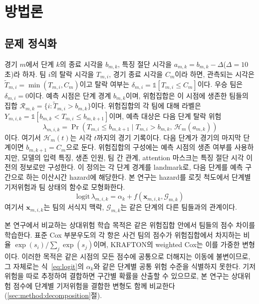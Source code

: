 \section{방법론}
\label{sec:method}

\subsection{문제 정식화}
\label{sec:method:formulation}

경기 $m$에서 단계 $k$의 종료 시각을 $b_{m,k}$, 특징 절단 시각을 $a_{m,k}=b_{m,k}-\Delta$($\Delta=10$초)라 하자.
팀 $i$의 탈락 시각을 $T_{m,i}$, 경기 종료 시각을 $C_m$이라 하면, 관측되는 시각은 $\widetilde T_{m,i}=\min(T_{m,i},C_m)$이고 탈락 여부는 $\delta_{m,i}=\mathbb{1}[T_{m,i}\le C_m]$이다. 우승 팀은 $\delta_{m,i}=0$이다.
예측 시점은 단계 경계 $b_{m,k}$이며, 위험집합은 이 시점에 생존한 팀들의 집합 $\mathcal{R}_{m,k}=\{i:\widetilde T_{m,i}>b_{m,k}\}$이다.
위험집합의 각 팀에 대해 라벨은 $Y_{m,i,k}=\mathbb{1}[b_{m,k}<T_{m,i}\le b_{m,k+1}]$이며, 예측 대상은 다음 단계 탈락 위험
\begin{equation}
\lambda_{m,i,k}=\Pr\!\left(T_{m,i}\le b_{m,k+1} \mid T_{m,i}>b_{m,k},\,\mathcal{H}_{m}(a_{m,k})\right)
\label{eq:hazard}
\end{equation}
이다. 여기서 $\mathcal{H}_{m}(t)$는 시각 $t$까지의 경기 기록이다.
다음 단계가 경기의 마지막 단계이면 $b_{m,k+1}=C_m$으로 둔다.
위험집합의 구성에는 예측 시점의 생존 여부를 사용하지만, 모델의 입력 특징, 생존 인원, 팀 간 관계, attention 마스크는 특징 절단 시각 이전의 정보로만 구성한다.
이 정의는 각 단계 경계를 landmark로, 다음 단계를 예측 구간으로 하는 이산시간 hazard에 해당한다.
본 연구는 hazard를 로짓 척도에서 단계별 기저위험과 팀 상태의 함수로 모형화한다.
\begin{equation}
\mathrm{logit}\,\lambda_{m,i,k}=\alpha_k+f(\mathbf{x}_{m,i,k},\mathcal{G}_{m,k})
\label{eq:logit}
\end{equation}
여기서 $\mathbf{x}_{m,i,k}$는 팀의 서식지 맥락, $\mathcal{G}_{m,k}$는 같은 단계의 다른 팀들과의 관계이다.

본 연구에서 비교하는 상대위험 학습 목적은 같은 위험집합 안에서 팀들의 점수 차이를 학습한다.
표준 Cox 부분우도의 각 항은 사건 팀의 점수가 위험집합에서 차지하는 비율 $\exp(s_i)/\sum_{j}\exp(s_j)$이며, KRAFTON의 weighted Cox는 이를 가중한 변형이다.
이러한 목적은 같은 시점의 모든 점수에 공통으로 더해지는 이동에 불변이므로, 그 자체로는 식~\eqref{eq:logit}의 $\alpha_k$와 같은 단계별 공통 위험 수준을 식별하지 못한다.
기저위험을 따로 추정하여 결합하면 구간별 확률을 산출할 수 있으므로, 본 연구는 상대위험 점수에 단계별 기저위험을 결합한 변형도 함께 비교한다(\ref{sec:method:decomposition}절).

